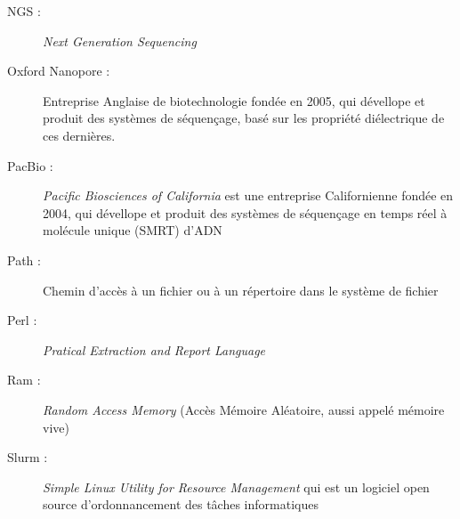 \begin{description}
    \item[NGS :] \emph{Next Generation Sequencing}
    \item[Oxford Nanopore :] Entreprise Anglaise de biotechnologie fondée en 2005, qui dévellope et produit des systèmes de séquençage, basé sur les propriété diélectrique de ces dernières.
    \item[PacBio :] \emph{Pacific Biosciences of California} est une entreprise Californienne fondée en 2004, qui dévellope et produit des systèmes de séquençage en temps réel à molécule unique (SMRT) d'ADN
    \item[Path : ] Chemin d'accès à un fichier ou à un répertoire dans le système de fichier
    \item[Perl :] \emph{Pratical Extraction and Report Language}
    \item[Ram :] \emph{Random Access Memory} (Accès Mémoire Aléatoire, aussi appelé mémoire vive)
    \item[Slurm :] \emph{Simple Linux Utility for Resource Management} qui est un logiciel open source d'ordonnancement des tâches informatiques
\end{description}